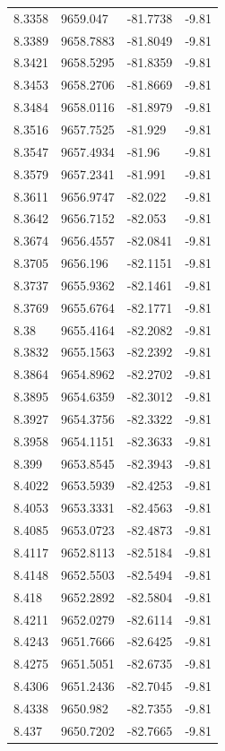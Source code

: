 \begin{table}[H]
\begin{tabular}{llll}
8.3358 & 9659.047 & -81.7738 & -9.81 \\
8.3389 & 9658.7883 & -81.8049 & -9.81 \\
8.3421 & 9658.5295 & -81.8359 & -9.81 \\
8.3453 & 9658.2706 & -81.8669 & -9.81 \\
8.3484 & 9658.0116 & -81.8979 & -9.81 \\
8.3516 & 9657.7525 & -81.929 & -9.81 \\
8.3547 & 9657.4934 & -81.96 & -9.81 \\
8.3579 & 9657.2341 & -81.991 & -9.81 \\
8.3611 & 9656.9747 & -82.022 & -9.81 \\
8.3642 & 9656.7152 & -82.053 & -9.81 \\
8.3674 & 9656.4557 & -82.0841 & -9.81 \\
8.3705 & 9656.196 & -82.1151 & -9.81 \\
8.3737 & 9655.9362 & -82.1461 & -9.81 \\
8.3769 & 9655.6764 & -82.1771 & -9.81 \\
8.38 & 9655.4164 & -82.2082 & -9.81 \\
8.3832 & 9655.1563 & -82.2392 & -9.81 \\
8.3864 & 9654.8962 & -82.2702 & -9.81 \\
8.3895 & 9654.6359 & -82.3012 & -9.81 \\
8.3927 & 9654.3756 & -82.3322 & -9.81 \\
8.3958 & 9654.1151 & -82.3633 & -9.81 \\
8.399 & 9653.8545 & -82.3943 & -9.81 \\
8.4022 & 9653.5939 & -82.4253 & -9.81 \\
8.4053 & 9653.3331 & -82.4563 & -9.81 \\
8.4085 & 9653.0723 & -82.4873 & -9.81 \\
8.4117 & 9652.8113 & -82.5184 & -9.81 \\
8.4148 & 9652.5503 & -82.5494 & -9.81 \\
8.418 & 9652.2892 & -82.5804 & -9.81 \\
8.4211 & 9652.0279 & -82.6114 & -9.81 \\
8.4243 & 9651.7666 & -82.6425 & -9.81 \\
8.4275 & 9651.5051 & -82.6735 & -9.81 \\
8.4306 & 9651.2436 & -82.7045 & -9.81 \\
8.4338 & 9650.982 & -82.7355 & -9.81 \\
8.437 & 9650.7202 & -82.7665 & -9.81 \\

\end{tabular}
\end{table}
